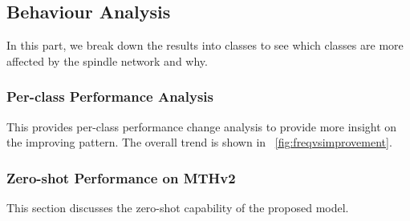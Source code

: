 \subsection{Behaviour Analysis}

In this part, we break down the results into classes to see which classes are more affected by the spindle network and why. 
\subsubsection{Per-class Performance Analysis}
This provides per-class performance change analysis to provide more insight on the improving pattern. 
The overall trend is shown in ~\ref{fig:freqvsimprovement}. 



\subsubsection{Zero-shot Performance on MTHv2}
This section discusses the zero-shot capability of the proposed model.
